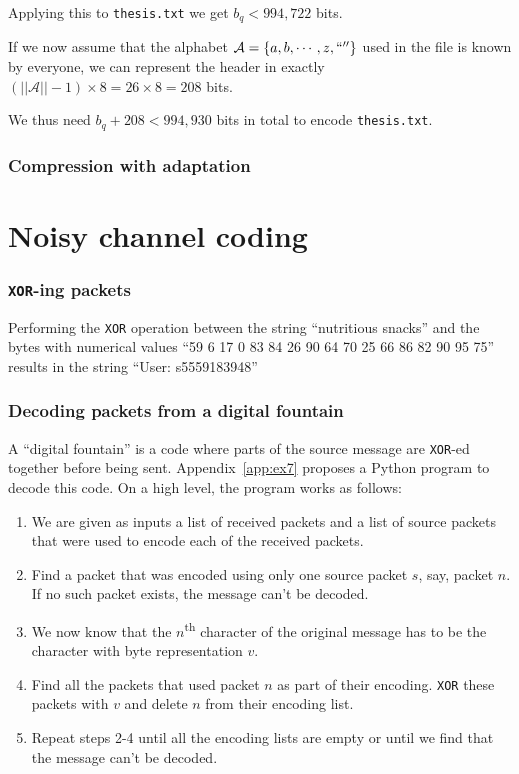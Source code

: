 \documentclass[10pt,a4paper,oneside,onecolumn]{article}
\newcommand*{\thesisTXT}{{\tt thesis.txt}\xspace}
\newcommand*{\XOR}{{\tt XOR}\xspace}
\newcommand*{\norm}[1]{\ensuremath{\left|\left|#1\right|\right|}}
\newcommand*{\lbr}{\ensuremath{\left\{}}
\newcommand*{\rbr}{\ensuremath{\right\}}}
\begin{document}
Applying this to \thesisTXT we get $b_q < 994,722$ bits.

If we now assume that the alphabet $\mathcal{A} = \lbr a, b, \cdots, z, `` ''
\rbr$ used in the file is known by everyone, we can represent the header in
exactly $(\norm{\mathcal{A}} - 1) \times 8 = 26 \times 8 = 208$
bits\footnotemark.

We thus need $b_q + 208 < 994,930$ bits in total to encode \thesisTXT.


\section{Compression with adaptation}\label{sec:ex5}


\part{Noisy channel coding}

\section{\XOR-ing packets}\label{sec:ex6}

Performing the \XOR operation between the string ``nutritious snacks'' and the
bytes with numerical values ``59 6 17 0 83 84 26 90 64 70 25 66 86 82 90 95 75''
results in the string ``User: s5559183948''

\section{Decoding packets from a digital fountain}\label{sec:ex7}

A ``digital fountain'' is a code where parts of the source message are \XOR-ed
together before being sent. Appendix~\ref{app:ex7} proposes a Python program to
decode this code. On a high level, the program works as follows:

\begin{enumerate}
\item We are given as inputs a list of received packets and a list of source
      packets that were used to encode each of the received packets.
\item Find a packet that was encoded using only one source packet $s$, say,
      packet $n$.  If no such packet exists, the message can't be decoded.
\item We now know that the $n$\textsuperscript{th} character of the original
      message has to be the character with byte representation $v$.
\item Find all the packets that used packet $n$ as part of their encoding.
      \XOR these packets with $v$ and delete $n$ from their encoding list.
\item Repeat steps 2-4 until all the encoding lists are empty or until we find
      that the message can't be decoded.
\end{enumerate}
\end{document}
